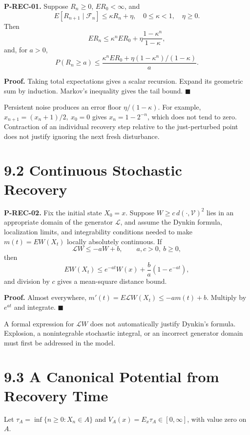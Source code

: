 \documentclass[
  english,
  11pt,
  oneside]{book}
\begin{document}
\hypertarget{p-rec-01}{}\label{p-rec-01}

\textbf{P-REC-01.} Suppose \(R_n\ge0\), \(ER_0<\infty\), and \[E[R_{n+1}\mid\mathcal F_n]\le\kappa R_n+\eta,
\quad0\le\kappa<1,\quad\eta\ge0.\] Then \[ER_n\le\kappa^nER_0+\eta\frac{1-\kappa^n}{1-\kappa},\] and, for \(a>0\), \[P(R_n\ge a)\le
\frac{\kappa^nER_0+\eta(1-\kappa^n)/(1-\kappa)}a.\]

\textbf{Proof.} Taking total expectations gives a scalar recursion. Expand its geometric sum by induction. Markov's inequality gives the tail bound. \(\blacksquare\)

Persistent noise produces an error floor \(\eta/(1-\kappa)\). For example, \(x_{n+1}=(x_n+1)/2,\ x_0=0\) gives \(x_n=1-2^{-n}\), which does not tend to zero. Contraction of an individual recovery step relative to the just-perturbed point does not justify ignoring the next fresh disturbance.

\section{9.2 Continuous Stochastic Recovery}\label{continuous-stochastic-recovery}

\hypertarget{p-rec-02}{}\label{p-rec-02}

\textbf{P-REC-02.} Fix the initial state \(X_0=x\). Suppose \(W\ge c\,d(\cdot,\mathcal V)^2\) lies in an appropriate domain of the generator \(\mathcal L\), and assume the Dynkin formula, localization limits, and integrability conditions needed to make \(m(t)=EW(X_t)\) locally absolutely continuous. If \[\mathcal LW\le-aW+b,\qquad a,c>0,\ b\ge0,\] then \[EW(X_t)\le e^{-at}W(x)+\frac ba(1-e^{-at}),\] and division by \(c\) gives a mean-square distance bound.

\textbf{Proof.} Almost everywhere, \(m'(t)=E\mathcal LW(X_t)\le-am(t)+b\). Multiply by \(e^{at}\) and integrate. \(\blacksquare\)

A formal expression for \(\mathcal LW\) does not automatically justify Dynkin's formula. Explosion, a nonintegrable stochastic integral, or an incorrect generator domain must first be addressed in the model.

\section{9.3 A Canonical Potential from Recovery Time}\label{a-canonical-potential-from-recovery-time}

Let \(\tau_A=\inf\{n\ge0:X_n\in A\}\) and \(V_A(x)=E_x\tau_A\in[0,\infty]\), with value zero on \(A\).
\end{document}
